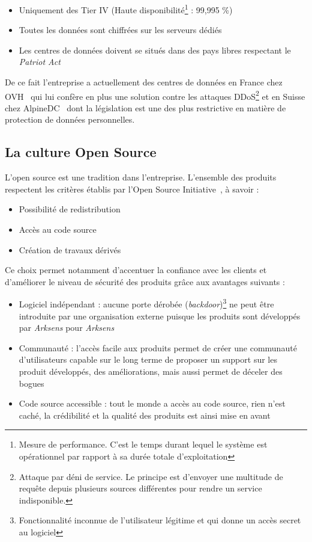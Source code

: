 \documentclass[a4paper,10pt, twoside]{report}
\begin{document}
\begin{spacing}{1.2}
\begin{itemize}
  \item Uniquement des Tier IV (Haute disponibilité\footnote{Mesure de
  performance. C'est le temps durant lequel le système est opérationnel par
  rapport à sa durée totale d'exploitation} : 99,995 \%)
  \item Toutes les données sont chiffrées sur les serveurs dédiés
  \item Les centres de données doivent se situés dans des pays libres
  respectant le \textit{Patriot Act}~\cite{refPatriotAct}
\end{itemize}

De ce fait l'entreprise a actuellement des centres de données en France
chez OVH~\cite{refOVH} qui lui confère en plus une solution contre les
attaques DDoS\footnote{Attaque par déni de service. Le principe est d'envoyer
une multitude de requête depuis plusieurs sources différentes pour rendre
un service indisponible.} et en Suisse chez AlpineDC~\cite{refAlpineDC} dont la
législation est une des plus restrictive en matière de protection de
données personnelles.

\subsection{La culture Open Source}

L'open source est une tradition dans l'entreprise. L'ensemble des
produits respectent les critères établis par l'Open Source
Initiative~\cite{refOSI}, à savoir :

\begin{itemize}
  \item Possibilité de redistribution
  \item Accès au code source
  \item Création de travaux dérivés
\end{itemize}

Ce choix permet notamment d'accentuer la confiance avec les clients et
d'améliorer le niveau de sécurité des produits grâce aux avantages
suivants :

\begin{itemize}
  \item Logiciel indépendant : aucune porte dérobée
  (\textit{backdoor})\footnote{Fonctionnalité inconnue de l'utilisateur
  légitime et qui donne un accès secret au logiciel} ne peut
  être introduite par une organisation externe puisque les produits sont
  développés par \textit{Arksens} pour \textit{Arksens}
  \item Communauté : l'accès facile aux produits permet de créer une
  communauté d'utilisateurs capable sur le long terme de proposer un
  support sur les produit développés, des améliorations, mais aussi
  permet de déceler des bogues
  \item Code source accessible : tout le monde a accès au code source,
  rien n'est caché, la crédibilité et la qualité des produits est ainsi
  mise en avant
\end{itemize}


\end{spacing}
\end{document}
